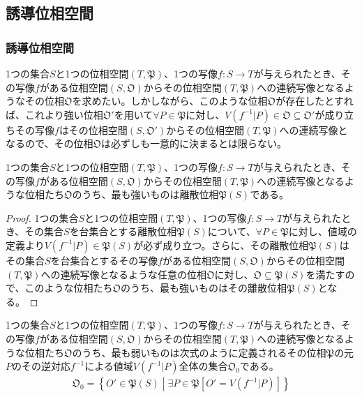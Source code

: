 \documentclass[dvipdfmx]{jsarticle}
\begin{document}
\subsection{誘導位相空間}%
\subsubsection{誘導位相空間}%
1つの集合$S$と1つの位相空間$\left( T,\mathfrak{P} \right)$、1つの写像$f:S \rightarrow T$が与えられたとき、その写像$f$がある位相空間$\left( S,\mathfrak{O} \right)$からその位相空間$\left( T,\mathfrak{P} \right)$への連続写像となるようなその位相$\mathfrak{O}$を求めたい。しかしながら、このような位相$\mathfrak{O}$が存在したとすれば、これより強い位相$\mathfrak{O}'$を用いて$\forall P \in \mathfrak{P}$に対し、$V\left( f^{- 1}|P \right)\in \mathfrak{O \subseteq}\mathfrak{O}'$が成り立ちその写像$f$はその位相空間$\left( S,\mathfrak{O}' \right)$からその位相空間$\left( T,\mathfrak{P} \right)$への連続写像となるので、その位相$\mathfrak{O}$は必ずしも一意的に決まるとは限らない。
\begin{thm}\label{8.1.4.1}
1つの集合$S$と1つの位相空間$\left( T,\mathfrak{P} \right)$、1つの写像$f:S \rightarrow T$が与えられたとき、その写像$f$がある位相空間$\left( S,\mathfrak{O} \right)$からその位相空間$\left( T,\mathfrak{P} \right)$への連続写像となるような位相たち$\mathfrak{O}$のうち、最も強いものは離散位相$\mathfrak{P}(S)$である。
\end{thm}
\begin{proof}
1つの集合$S$と1つの位相空間$\left( T,\mathfrak{P} \right)$、1つの写像$f:S \rightarrow T$が与えられたとき、その集合$S$を台集合とする離散位相$\mathfrak{P}(S)$について、$\forall P \in \mathfrak{P}$に対し、値域の定義より$V\left( f^{- 1}|P \right)\in \mathfrak{P}(S)$が必ず成り立つ。さらに、その離散位相$\mathfrak{P}(S)$はその集合$S$を台集合とするその写像$f$がある位相空間$\left( S,\mathfrak{O} \right)$からその位相空間$\left( T,\mathfrak{P} \right)$への連続写像となるような任意の位相$\mathfrak{O}$に対し、$\mathfrak{O \subseteq P}(S)$を満たすので、このような位相たち$\mathfrak{O}$のうち、最も強いものはその離散位相$\mathfrak{P}(S)$となる。
\end{proof}
\begin{thm}\label{8.1.4.2}
1つの集合$S$と1つの位相空間$\left( T,\mathfrak{P} \right)$、1つの写像$f:S \rightarrow T$が与えられたとき、その写像$f$がある位相空間$\left( S,\mathfrak{O} \right)$からその位相空間$\left( T,\mathfrak{P} \right)$への連続写像となるような位相たち$\mathfrak{O}$のうち、最も弱いものは次式のように定義されるその位相$\mathfrak{P}$の元$P$のその逆対応$f^{- 1}$による値域$V\left( f^{- 1}|P \right)$全体の集合$\mathfrak{O}_{0}$である。
\begin{align*}
\mathfrak{O}_{0} = \left\{ O'\in \mathfrak{P}(S) \middle| \exists P \in \mathfrak{P}\left[ O' = V\left( f^{- 1}|P \right) \right] \right\}
\end{align*}
\end{thm}
\end{document}
